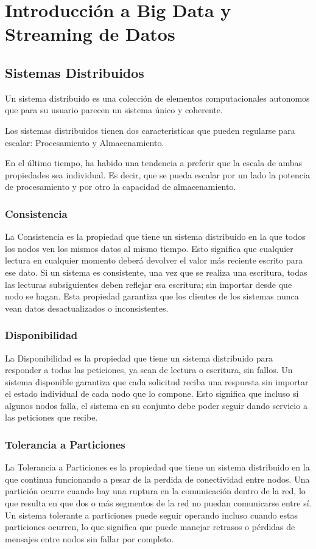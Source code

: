 \section{Introducción a Big Data y Streaming de Datos}

\subsection{Sistemas Distribuidos}
Un sistema distribuido es una colección de elementos computacionales autonomos que para su usuario 
parecen un sistema único y coherente. \parencite{tanenbaum}

Los sistemas distribuidos tienen dos caracteristicas que pueden regularse para escalar: Procesamiento y Almacenamiento. 
\newline

En el último tiempo, ha habido una tendencia a preferir que la escala de ambas propiedades sea individual. 
Es decir, que se pueda escalar por un lado la potencia de procesamiento y por otro la capacidad de almacenamiento.

\subsubsection{Consistencia}
La Consistencia es la propiedad que tiene un sistema distribuido en la que todos los nodos ven los mismos datos al mismo tiempo.
Esto significa que cualquier lectura en cualquier momento deberá devolver el valor más reciente escrito para ese dato.
Si un sistema es consistente, una vez que se realiza una escritura, todas las lecturas subsiguientes deben reflejar esa escritura;
sin importar desde que nodo se hagan. 
Esta propiedad garantiza que los clientes de los sistemas nunca vean datos desactualizados o inconsistentes.
\newpage
\subsubsection{Disponibilidad}
La Disponibilidad es la propiedad que tiene un sistema distribuido para responder a todas las peticiones, ya sean de lectura o escritura, sin fallos.
Un sistema disponible garantiza que cada solicitud reciba una respuesta sin importar el estado individual de cada nodo que lo compone.
Esto significa que incluso si algunos nodos falla, el sistema en su conjunto debe poder seguir dando servicio a las peticiones que recibe.
\subsubsection{Tolerancia a Particiones}
La Tolerancia a Particiones es la propiedad que tiene un sistema distribuido en la que continua funcionando a pesar de la perdida de 
conectividad entre nodos. Una partición ocurre cuando hay una ruptura en la comunicación dentro de la red, 
lo que resulta en que dos o más segmentos de la red no puedan comunicarse entre sí.
Un sistema tolerante a particiones puede seguir operando incluso cuando estas particiones ocurren, 
lo que significa que puede manejar retrasos o pérdidas de mensajes entre nodos sin fallar por completo. 

